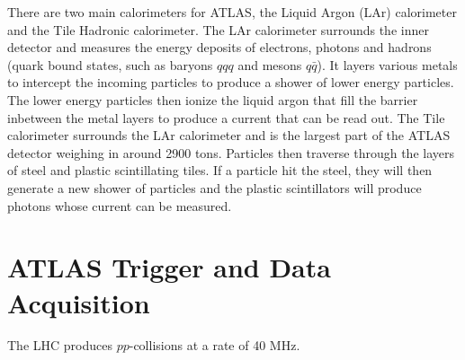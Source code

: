 There are two main calorimeters for ATLAS, the Liquid Argon (LAr) calorimeter and the Tile Hadronic calorimeter.
The LAr calorimeter surrounds the inner detector and measures the energy deposits of electrons, photons and hadrons (quark bound states, such as baryons $qqq$ and mesons $q\bar{q}$). 
It layers various metals to intercept the incoming particles to produce a shower of lower energy particles. 
The lower energy particles then ionize the liquid argon that fill the barrier inbetween the metal layers to produce a current that can be read out.
The Tile calorimeter surrounds the LAr calorimeter and is the largest part of the ATLAS detector weighing in around 2900 tons. 
Particles then traverse through the layers of steel and plastic scintillating tiles. 
If a particle hit the steel, they will then generate a new shower of particles and the plastic scintillators will produce photons whose current can be measured.

\section{ATLAS Trigger and Data Acquisition}

The LHC produces $pp$-collisions at a rate of 40 MHz. 
